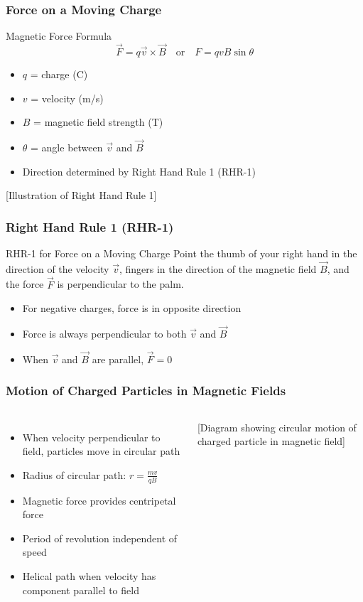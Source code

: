 \documentclass{beamer}
\begin{document}
\begin{frame}
\frametitle{Force on a Moving Charge}
\begin{block}{Magnetic Force Formula}
\begin{equation}
\vec{F} = q\vec{v} \times \vec{B} \quad \text{or} \quad F = qvB\sin\theta
\end{equation}
\end{block}
\begin{itemize}
    \item $q$ = charge (C)
    \item $v$ = velocity (m/s)
    \item $B$ = magnetic field strength (T)
    \item $\theta$ = angle between $\vec{v}$ and $\vec{B}$
    \item Direction determined by Right Hand Rule 1 (RHR-1)
\end{itemize}
\alert{[Illustration of Right Hand Rule 1]}
\end{frame}

\begin{frame}
\frametitle{Right Hand Rule 1 (RHR-1)}
\begin{block}{RHR-1 for Force on a Moving Charge}
Point the thumb of your right hand in the direction of the velocity $\vec{v}$, fingers in the direction of the magnetic field $\vec{B}$, and the force $\vec{F}$ is perpendicular to the palm.
\end{block}
\begin{itemize}
    \item For negative charges, force is in opposite direction
    \item Force is always perpendicular to both $\vec{v}$ and $\vec{B}$
    \item When $\vec{v}$ and $\vec{B}$ are parallel, $\vec{F} = 0$
\end{itemize}
\end{frame}

\begin{frame}
\frametitle{Motion of Charged Particles in Magnetic Fields}
\begin{columns}
\begin{itemize}
    \item When velocity perpendicular to field, particles move in circular path
    \item Radius of circular path: $r = \frac{mv}{qB}$
    \item Magnetic force provides centripetal force
    \item Period of revolution independent of speed
    \item Helical path when velocity has component parallel to field
\end{itemize}
\alert{[Diagram showing circular motion of charged particle in magnetic field]}
\end{columns}
\end{frame}
\end{document}
